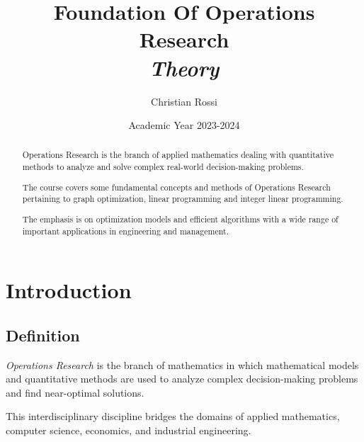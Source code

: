 \documentclass[12pt, a4paper]{report}
\title{Foundation Of Operations Research \\ \textit{Theory}}
\author{Christian Rossi}
\date{Academic Year 2023-2024}
\begin{document}
\maketitle

\newpage

\begin{abstract}
    Operations Research is the branch of applied mathematics dealing with quantitative methods to analyze and solve
    complex real-world decision-making problems. 
    
    The course covers some fundamental concepts and methods of Operations Research pertaining to graph optimization, 
    linear programming and integer linear programming. 
    
    The emphasis is on optimization models and efficient algorithms with a wide range of important applications in 
    engineering and management.  
\end{abstract}

\newpage

\tableofcontents

\newpage
 
\chapter{Introduction}
    \section{Definition}
    \begin{definition}
        \emph{Operations Research} is the branch of mathematics in which mathematical models and quantitative methods are used to analyze complex decision-making problems and find near-optimal solutions.
    \end{definition}
    This interdisciplinary discipline bridges the domains of applied mathematics, computer science, economics, and industrial engineering.
    
\end{document}
